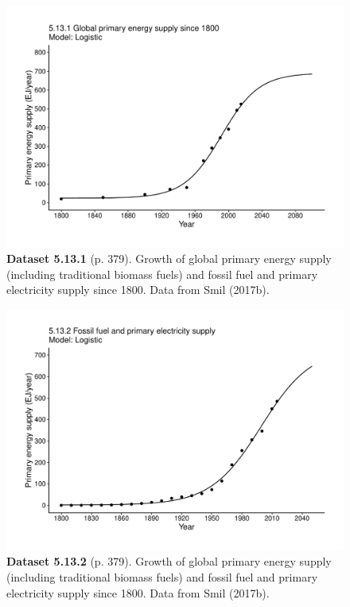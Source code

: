 \documentclass[aps,rmp,preprint,superscriptaddress,10pt,onecolumn]{article}
\begin{document}
\clearpage
\begin{figure}[h]
\includegraphics[width=\textwidth]{output/figs-ggplot/5.13.1.pdf}
\caption*{\textbf{Dataset 5.13.1} (p. 379). Growth of global primary energy supply (including traditional biomass fuels) and fossil fuel and primary electricity supply since 1800. Data from Smil (2017b). }
\end{figure}
	
\clearpage
\begin{figure}[h]
\includegraphics[width=\textwidth]{output/figs-ggplot/5.13.2.pdf}
\caption*{\textbf{Dataset 5.13.2} (p. 379). Growth of global primary energy supply (including traditional biomass fuels) and fossil fuel and primary electricity supply since 1800. Data from Smil (2017b). }
\end{figure}
	
\end{document}
